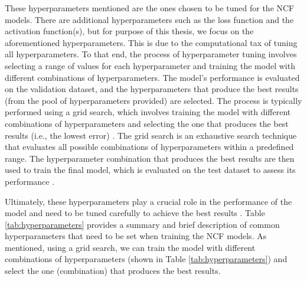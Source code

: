 These hyperparameters mentioned are the ones chosen to be tuned for the NCF models. There are additional hyperparameters such as the loss function and the activation function(s), but for purpose of this thesis, we focus on the aforementioned hyperparameters. This is due to the computational tax of tuning all hyperparameters. To that end, the process of hyperparameter tuning involves selecting a range of values for each hyperparameter and training the model with different combinations of hyperparameters. The model's performance is evaluated on the validation dataset, and the hyperparameters that produce the best results (from the pool of hyperparameters provided) are selected. The process is typically performed using a grid search, which involves training the model with different combinations of hyperparameters and selecting the one that produces the best results (i.e., the lowest error) \cite{bergstra2011algorithms}. The grid search is an exhaustive search technique that evaluates all possible combinations of hyperparameters within a predefined range. The hyperparameter combination that produces the best results are then used to train the final model, which is evaluated on the test dataset to assess its performance \cite{bergstra2011algorithms}.

Ultimately, these hyperparameters play a crucial role in the performance of the model and need to be tuned carefully to achieve the best results \cite{bergstra2011algorithms}. Table \ref{tab:hyperparameters} provides a summary and brief description of common hyperparameters that need to be set when training the NCF models. As mentioned, using a grid search, we can train the model with different combinations of hyperparameters (shown in Table \ref{tab:hyperparameters}) and select the one (combination) that produces the best results. 


